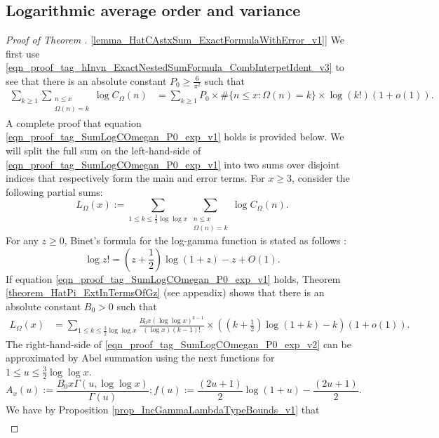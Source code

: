 \documentclass[11pt,reqno,a4letter]{article}
\newcommand{\hlocalref}[1]{\hyperref[#1]{\ref{#1}}}
\numberwithin{equation}{section}
\numberwithin{figure}{section}
\numberwithin{table}{section}
\theoremstyle{plain}
\numberwithin{theorem}{section}
\theoremstyle{definition}
\begin{document}
\subsection{Logarithmic average order and variance}
\label{subSection_AvgOrdersOfTheUnsignedSequences} 

\begin{proof}[Proof of Theorem \hlocalref{lemma_HatCAstxSum_ExactFormulaWithError_v1}]  
We first use \eqref{eqn_proof_tag_hInvn_ExactNestedSumFormula_CombInterpetIdent_v3} to 
see that there is an absolute constant $P_0 \geq \frac{6}{\pi^2}$ such that 
\begin{align}
\label{eqn_proof_tag_SumLogCOmegan_P0_exp_v1}
\sum_{k \geq 1} \sum_{\substack{n \leq x \\ \Omega(n)=k}} \log C_{\Omega}(n) & = 
	\sum_{k \geq 1} P_0 \times \#\{n \leq x: \Omega(n)=k\} \times \log(k!) (1 + o(1)). 
\end{align}
A complete proof that equation 
\eqref{eqn_proof_tag_SumLogCOmegan_P0_exp_v1} holds is provided below.
We will split the full sum on the left-hand-side of 
\eqref{eqn_proof_tag_SumLogCOmegan_P0_exp_v1} into two sums over disjoint indices 
that respectively form the main and error terms.
For $x \geq 3$, consider the following partial sums:
\[
L_{\Omega}(x) := \sum_{1 \leq k \leq \frac{3}{2}\log\log x} 
	\sum_{\substack{n \leq x \\ \Omega(n)=k}} \log C_{\Omega}(n). 
\]
For any $z \geq 0$, 
Binet's formula for the log-gamma function is stated as follows 
\cite[\S 5.9(i)]{NISTHB}: 
\[
\log z! = \left(z+\frac{1}{2}\right)\log(1+z) - z + O(1). 
\]
If equation \eqref{eqn_proof_tag_SumLogCOmegan_P0_exp_v1} holds, 
Theorem \ref{theorem_HatPi_ExtInTermsOfGz} 
(see appendix) shows that there is an absolute constant $B_0 > 0$ such that 
\begin{align}
\label{eqn_proof_tag_SumLogCOmegan_P0_exp_v2}
L_{\Omega}(x) & = \sum_{1 \leq k \leq \frac{3}{2}\log\log x} 
	\frac{B_0 x (\log\log x)^{k-1}}{(\log x) (k-1)!} \times \left(
	\left(k+\frac{1}{2}\right) \log(1+k) - k\right)\left(1 + o(1)\right). 
\end{align}
The right-hand-side of \eqref{eqn_proof_tag_SumLogCOmegan_P0_exp_v2} can be 
approximated by Abel summation using the next functions for 
$1 \leq u \leq \frac{3}{2} \log\log x$. 
\[
A_x(u) := \frac{B_0 x \Gamma\left(u, \log\log x\right)}{\Gamma\left(u\right)}; 
     f(u) := \frac{(2u+1)}{2} \log\left(1 + u\right) - \frac{(2u+1)}{2}. 
\]
We have by Proposition \hlocalref{prop_IncGammaLambdaTypeBounds_v1} that 
\begin{align*}

\end{align*}
\end{proof}
\end{document}
